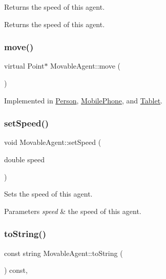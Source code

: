 Returns the speed of this agent. \begin{DoxyReturn}{Returns}
the speed of this agent. 
\end{DoxyReturn}
\mbox{\label{class_movable_agent_a88b617f0e78c817634e5b587da045ab0}} 
\subsubsection{\texorpdfstring{move()}{move()}}
{\footnotesize\ttfamily virtual Point$\ast$ Movable\+Agent\+::move (\begin{DoxyParamCaption}{ }\end{DoxyParamCaption})\hspace{0.3cm}{\ttfamily [pure virtual]}}



Implemented in \mbox{\hyperlink{class_person_a922e0462a1e7eac6523a9a864ce27afc}{Person}}, \mbox{\hyperlink{class_mobile_phone_a785d0cac08252386603c702ad8f38c5b}{Mobile\+Phone}}, and \mbox{\hyperlink{class_tablet_ab1b8c7591be0c6ea118c8ab1c17839bb}{Tablet}}.

\mbox{\label{class_movable_agent_ae2ef452e81789a4370e7dee32a9cc67e}} 
\subsubsection{\texorpdfstring{setSpeed()}{setSpeed()}}
{\footnotesize\ttfamily void Movable\+Agent\+::set\+Speed (\begin{DoxyParamCaption}\item[{double}]{speed }\end{DoxyParamCaption})}

Sets the speed of this agent. 
\begin{DoxyParams}{Parameters}
{\em speed} & the speed of this agent. \\
\hline
\end{DoxyParams}
\mbox{\label{class_movable_agent_a1dee2a6bf93f01006fadfb6fba6c9a59}} 
\subsubsection{\texorpdfstring{toString()}{toString()}}
{\footnotesize\ttfamily const string Movable\+Agent\+::to\+String (\begin{DoxyParamCaption}{ }\end{DoxyParamCaption}) const\hspace{0.3cm}{\ttfamily [override]}, {\ttfamily [virtual]}}


